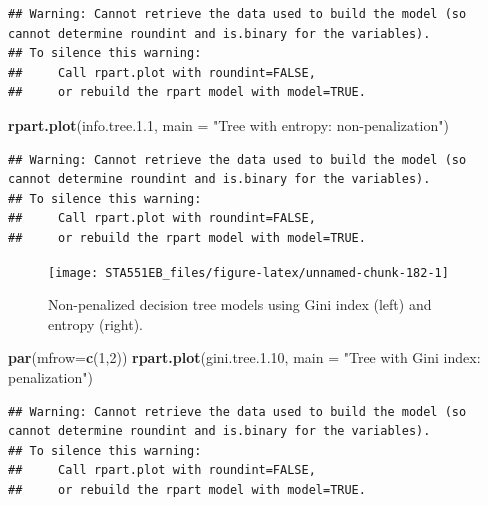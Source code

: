 \documentclass[
]{book}
\newenvironment{Shaded}{\begin{snugshade}}{\end{snugshade}}
\newcommand{\AttributeTok}[1]{\textcolor[rgb]{0.13,0.29,0.53}{#1}}
\newcommand{\DecValTok}[1]{\textcolor[rgb]{0.00,0.00,0.81}{#1}}
\newcommand{\FloatTok}[1]{\textcolor[rgb]{0.00,0.00,0.81}{#1}}
\newcommand{\FunctionTok}[1]{\textcolor[rgb]{0.13,0.29,0.53}{\textbf{#1}}}
\newcommand{\NormalTok}[1]{#1}
\newcommand{\StringTok}[1]{\textcolor[rgb]{0.31,0.60,0.02}{#1}}
\begin{document}
\begin{verbatim}
## Warning: Cannot retrieve the data used to build the model (so cannot determine roundint and is.binary for the variables).
## To silence this warning:
##     Call rpart.plot with roundint=FALSE,
##     or rebuild the rpart model with model=TRUE.
\end{verbatim}

\begin{Shaded}
\begin{Highlighting}[]
\FunctionTok{rpart.plot}\NormalTok{(info.tree.}\FloatTok{1.1}\NormalTok{, }\AttributeTok{main =} \StringTok{"Tree with entropy: non{-}penalization"}\NormalTok{)}
\end{Highlighting}
\end{Shaded}

\begin{verbatim}
## Warning: Cannot retrieve the data used to build the model (so cannot determine roundint and is.binary for the variables).
## To silence this warning:
##     Call rpart.plot with roundint=FALSE,
##     or rebuild the rpart model with model=TRUE.
\end{verbatim}

\begin{figure}

{\centering \texttt{[image: STA551EB\_files/figure-latex/unnamed-chunk-182-1]} 

}

\caption{Non-penalized decision tree models using Gini index (left) and entropy (right).}\label{fig:unnamed-chunk-182}
\end{figure}

\begin{Shaded}
\begin{Highlighting}[]
\FunctionTok{par}\NormalTok{(}\AttributeTok{mfrow=}\FunctionTok{c}\NormalTok{(}\DecValTok{1}\NormalTok{,}\DecValTok{2}\NormalTok{))}
\FunctionTok{rpart.plot}\NormalTok{(gini.tree.}\FloatTok{1.10}\NormalTok{, }\AttributeTok{main =} \StringTok{"Tree with Gini index: penalization"}\NormalTok{)}
\end{Highlighting}
\end{Shaded}

\begin{verbatim}
## Warning: Cannot retrieve the data used to build the model (so cannot determine roundint and is.binary for the variables).
## To silence this warning:
##     Call rpart.plot with roundint=FALSE,
##     or rebuild the rpart model with model=TRUE.
\end{verbatim}
\end{document}
